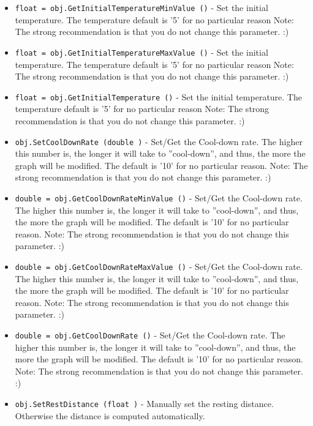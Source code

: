\begin{itemize}
\item  \verb|float = obj.GetInitialTemperatureMinValue ()| -  Set the initial temperature.  The temperature default is '5'
 for no particular reason
 Note: The strong recommendation is that you do not change
 this parameter. :)

\item  \verb|float = obj.GetInitialTemperatureMaxValue ()| -  Set the initial temperature.  The temperature default is '5'
 for no particular reason
 Note: The strong recommendation is that you do not change
 this parameter. :)

\item  \verb|float = obj.GetInitialTemperature ()| -  Set the initial temperature.  The temperature default is '5'
 for no particular reason
 Note: The strong recommendation is that you do not change
 this parameter. :)

\item  \verb|obj.SetCoolDownRate (double )| -  Set/Get the Cool-down rate.
 The higher this number is, the longer it will take to ''cool-down'',
 and thus, the more the graph will be modified. The default is '10'
 for no particular reason. 
 Note: The strong recommendation is that you do not change
 this parameter. :)

\item  \verb|double = obj.GetCoolDownRateMinValue ()| -  Set/Get the Cool-down rate.
 The higher this number is, the longer it will take to ''cool-down'',
 and thus, the more the graph will be modified. The default is '10'
 for no particular reason. 
 Note: The strong recommendation is that you do not change
 this parameter. :)

\item  \verb|double = obj.GetCoolDownRateMaxValue ()| -  Set/Get the Cool-down rate.
 The higher this number is, the longer it will take to ''cool-down'',
 and thus, the more the graph will be modified. The default is '10'
 for no particular reason. 
 Note: The strong recommendation is that you do not change
 this parameter. :)

\item  \verb|double = obj.GetCoolDownRate ()| -  Set/Get the Cool-down rate.
 The higher this number is, the longer it will take to ''cool-down'',
 and thus, the more the graph will be modified. The default is '10'
 for no particular reason. 
 Note: The strong recommendation is that you do not change
 this parameter. :)

\item  \verb|obj.SetRestDistance (float )| -  Manually set the resting distance. Otherwise the
 distance is computed automatically.


\end{itemize}
